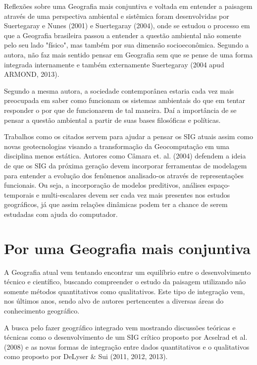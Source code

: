 Reflexões sobre uma Geografia mais conjuntiva e voltada em entender a paisagem através de uma perspectiva ambiental e sistêmica foram desenvolvidas por Suertegaray e Nunes (2001)\cite{SUERTEGARAY_NUNES} e Suertegaray (2004)\cite{SUERTEGARAY}, onde se estudou o processo em que a Geografia brasileira passou a entender a questão ambiental não somente pelo seu lado "físico", mas também por sua dimensão socioeconômica. Segundo a autora, não faz mais sentido pensar em Geografia sem que se pense de uma forma integrada internamente e também externamente Suertegaray (2004\cite{SUERTEGARAY} apud ARMOND, 2013\cite{ARMOND}). 

Segundo a mesma autora, a sociedade contemporânea estaria cada vez mais preocupada em saber como funcionam os sistemas ambientais do que em tentar responder o por que de funcionarem de tal maneira. Daí a importância de se pensar a questão ambiental a partir de suas bases filosóficas e políticas. 

Trabalhos como os citados servem para ajudar a pensar os SIG atuais assim como novas geotecnologias visando a transformação da Geocomputação em uma disciplina menos estática. Autores como Câmara et. al. (2004) defendem a ideia de que os SIG da próxima geração devem incorporar ferramentas de modelagem para entender a evolução dos fenômenos analisado-os através de representações funcionais. Ou seja, a incorporação de modelos preditivos, análises espaço-temporais e multi-escalares devem ser cada vez mais presentes nos estudos geográficos, já que assim relações dinâmicas podem ter a chance de serem estudadas com ajuda do computador.

 
\section{Por uma Geografia mais conjuntiva}

A Geografia atual vem tentando encontrar um equilíbrio entre o desenvolvimento técnico e científico, buscando compreender o estudo da paisagem utilizando não somente métodos quantitativos como qualitativos. Este tipo de integração vem, nos últimos anos, sendo alvo de autores pertencentes a diversas áreas do conhecimento geográfico.

A busca pelo fazer geográfico integrado vem mostrando discussões teóricas e técnicas como o desenvolvimento de um SIG crítico proposto por Acselrad et al. (2008)\cite{ACSELRAD} e as novas formas de integração entre dados quantitativos e o qualitativos como proposto por DeLyser \& Sui (2011\cite{DELYSER_SUI_11}, 2012\cite{DELYSER_SUI_12}, 2013\cite{DELYSER_SUI_13}).

